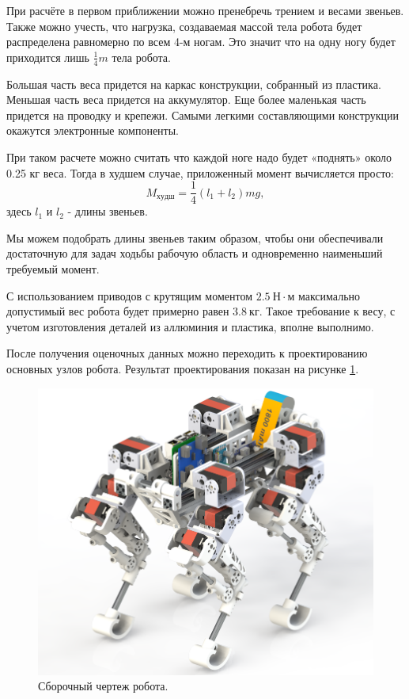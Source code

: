 При расчёте в первом приближении можно пренебречь трением и весами звеньев. Также можно учесть, что нагрузка, создаваемая массой тела робота будет распределена равномерно по всем 4-м ногам. Это значит что на одну ногу будет приходится лишь $\frac{1}{4}m$ тела робота.

Большая часть веса придется на каркас конструкции, собранный из пластика. Меньшая часть веса придется на аккумулятор. Еще более маленькая часть придется на проводку и крепежи. Самыми легкими составляющими конструкции окажутся электронные компоненты. 

При таком расчете можно считать что каждой ноге надо будет «поднять» около 0.25 кг веса. Тогда в худшем случае, приложенный момент вычисляется просто:
$$ M_{худш}= \frac 1 4 (l_{1}+l_{2}) m g, $$
\noindent здесь $l_1$ и $l_2$ - длины звеньев.

Мы можем подобрать длины звеньев таким образом, чтобы они обеспечивали достаточную для задач ходьбы рабочую область и одновременно наименьший требуемый момент.

\noindent С использованием приводов с крутящим моментом $ 2.5 \: Н \cdot м $ максимально допустимый вес робота будет примерно равен $ 3.8 \: кг $. Такое требование к весу, с учетом изготовления деталей из аллюминия и пластика, вполне выполнимо.

После получения оценочных данных можно переходить к проектированию основных узлов робота. Результат проектирования показан на рисунке \ref{fig:final_render}.

\begin{figure}[h]
    \centering
    \includegraphics[width=\textwidth]{chapter_mechanics_construction/figure20.png}
    \caption{Сборочный чертеж робота.}
    \label{fig:final_render}
\end{figure}

